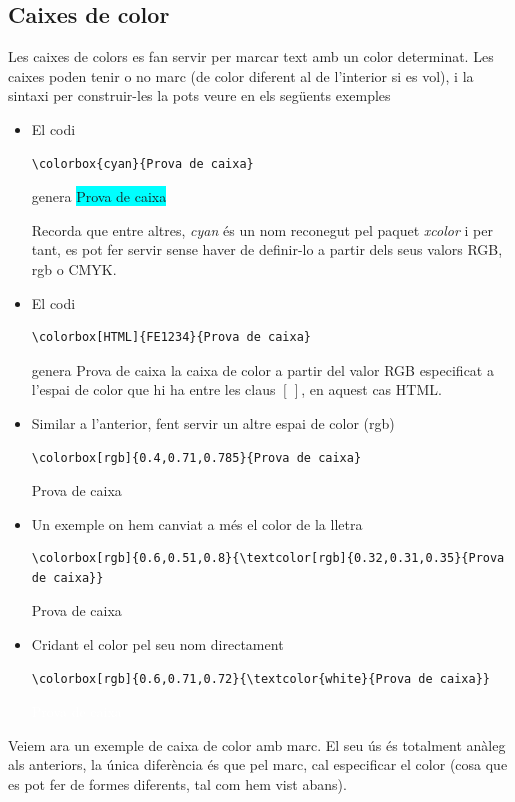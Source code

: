 \documentclass[a4paper,12pt]{article}
\begin{document}
\subsection{Caixes de color}
\label{sec:colorbox}
Les caixes de colors es fan servir per marcar text amb un color determinat. Les caixes poden tenir o no marc (de color diferent al de l'interior si es vol), i la sintaxi per construir-les la pots veure en els següents exemples
\begin{itemize}
\item
El codi
\begin{verbatim}
\colorbox{cyan}{Prova de caixa}
\end{verbatim}
genera 
\colorbox{cyan}{Prova de caixa}

Recorda que entre altres, \emph{cyan} és un nom reconegut pel paquet \emph{xcolor} i per tant, es pot fer servir sense haver de definir-lo a partir dels seus valors RGB, rgb o CMYK.
\item
El codi
\begin{verbatim}
\colorbox[HTML]{FE1234}{Prova de caixa}
\end{verbatim}
genera
\colorbox[HTML]{AE1234}{Prova de caixa}
la caixa de color a partir del valor RGB especificat a l'espai de color que hi ha entre les claus $[\,]$, en aquest cas HTML.
\item
Similar a l'anterior, fent servir un altre espai de color (rgb)

\begin{verbatim}
\colorbox[rgb]{0.4,0.71,0.785}{Prova de caixa}
\end{verbatim}
\colorbox[rgb]{0.4,0.71,0.785}{Prova de caixa}
\item
Un exemple on hem canviat a més el color de la lletra

\begin{verbatim}
\colorbox[rgb]{0.6,0.51,0.8}{\textcolor[rgb]{0.32,0.31,0.35}{Prova de caixa}}
\end{verbatim}
\colorbox[rgb]{0.6,0.51,0.8}{\textcolor[rgb]{0.32,0.31,0.35}{Prova de caixa}}
\item
Cridant el color pel seu nom directament
\begin{verbatim}
\colorbox[rgb]{0.6,0.71,0.72}{\textcolor{white}{Prova de caixa}}
\end{verbatim}
\colorbox[rgb]{0.6,0.71,0.72}{\textcolor{white}{Prova de caixa}}
\end{itemize}
\clearpage
Veiem ara un exemple de caixa de color amb marc. El seu ús és totalment anàleg als anteriors, la única diferència és que pel marc, cal especificar el color (cosa que es pot fer de formes diferents, tal com hem vist abans).
\end{document}
